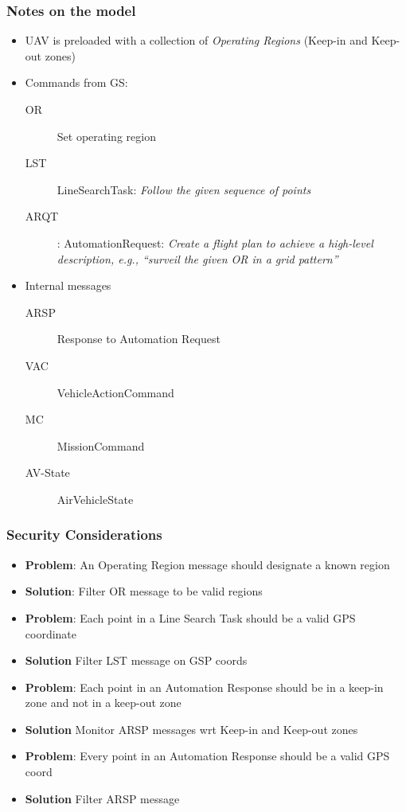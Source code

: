 \documentclass{beamer}
\begin{document}
\begin{frame}\frametitle{Notes on the model}

\begin{itemize}
\item UAV is preloaded with a collection of \emph{Operating Regions}
  (Keep-in and Keep-out zones)
\item Commands from GS:
\begin{description}
  \item [OR] Set operating region
  \item [LST] LineSearchTask: \emph{Follow the given sequence of points}
  \item [ARQT] : AutomationRequest: \emph{Create a flight plan to
    achieve a high-level description, e.g., ``surveil the given OR in
    a grid pattern''}
\end{description}

\item Internal messages
\begin{description}
  \item [ARSP]  Response to Automation Request
  \item [VAC]  VehicleActionCommand
  \item [MC]  MissionCommand
  \item [AV-State] AirVehicleState
\end{description}

\end{itemize}

\end{frame}

\begin{frame}\frametitle{Security Considerations}

\begin{itemize}[<+->]
\item \textbf{Problem}: An Operating Region message should designate a known region
\item \textbf{Solution}: Filter OR message to be valid regions

\item \textbf{Problem}: Each point in a Line Search Task should be a valid GPS coordinate
\item \textbf{Solution} Filter LST message on GSP coords

\item \textbf{Problem}: Each point in an Automation Response should be
  in a keep-in zone and not in a keep-out zone
\item \textbf{Solution} Monitor ARSP messages wrt Keep-in and Keep-out zones

\item \textbf{Problem}: Every point in an Automation Response should be a valid GPS coord
\item \textbf{Solution} Filter ARSP message
\end{itemize}

\end{frame}
\end{document}
